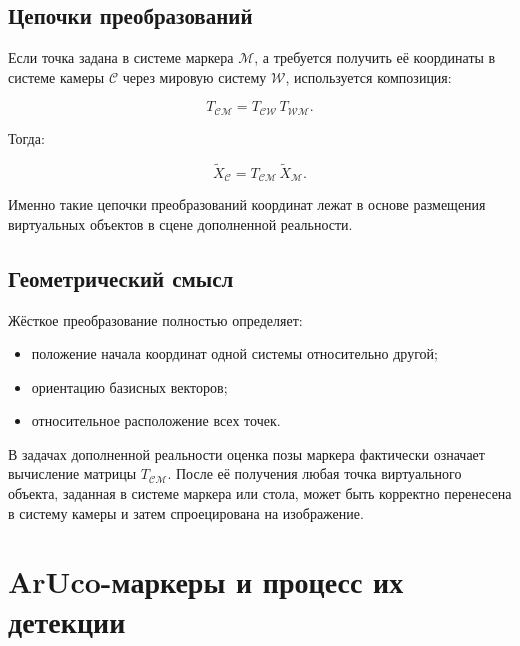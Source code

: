 \documentclass[a4paper,12pt]{article}
\begin{document}
\subsection*{Цепочки преобразований}

Если точка задана в системе маркера $\mathcal{M}$, а требуется получить её координаты в системе камеры $\mathcal{C}$ через мировую систему $\mathcal{W}$, используется композиция:

\begin{equation}
T_{\mathcal{C}\mathcal{M}} =
T_{\mathcal{C}\mathcal{W}} \,
T_{\mathcal{W}\mathcal{M}}.
\end{equation}

Тогда:

\begin{equation}
\tilde{X}_{\mathcal{C}} =
T_{\mathcal{C}\mathcal{M}} \,
\tilde{X}_{\mathcal{M}}.
\end{equation}

Именно такие цепочки преобразований координат лежат в основе размещения виртуальных объектов в сцене дополненной реальности.

\subsection*{Геометрический смысл}

Жёсткое преобразование полностью определяет:

\begin{itemize}
    \item положение начала координат одной системы относительно другой;
    \item ориентацию базисных векторов;
    \item относительное расположение всех точек.
\end{itemize}

В задачах дополненной реальности оценка позы маркера фактически означает вычисление матрицы $T_{\mathcal{C}\mathcal{M}}$. После её получения любая точка виртуального объекта, заданная в системе маркера или стола, может быть корректно перенесена в систему камеры и затем спроецирована на изображение.









\section*{ArUco-маркеры и процесс их детекции}
\end{document}
